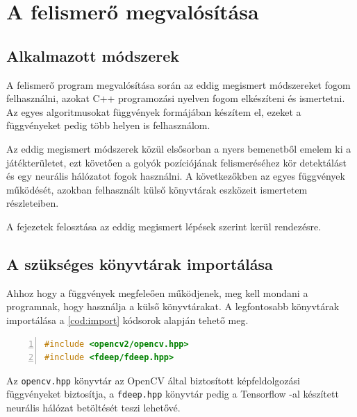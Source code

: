 \renewcommand{\lstlistingname}{kódrészlet}

\chapter{A felismerő megvalósítása}
\section{Alkalmazott módszerek}
A felismerő program megvalósítása során az eddig megismert módszereket fogom felhasználni, azokat C++ programozási nyelven fogom elkészíteni és ismertetni. Az egyes algoritmusokat függvények formájában készítem el, ezeket a függvényeket pedig több helyen is felhasználom.
\par Az eddig megismert módszerek közül elsősorban a nyers bemenetből emelem ki a játékterületet, ezt követően a golyók pozíciójának felismeréséhez kör detektálást és egy neurális hálózatot fogok használni. A következőkben az egyes függvények működését, azokban felhasznált külső könyvtárak eszközeit ismertetem részleteiben.
\par A fejezetek felosztása az eddig megismert lépések szerint kerül rendezésre.

\section{A szükséges könyvtárak importálása}
Ahhoz hogy a függvények megfeleően működjenek, meg kell mondani a programnak, hogy használja a külső könyvtárakat.
\newline A legfontosabb könyvtárak importálása a \ref{cod:import} kódsorok alapján tehető meg.

\vspace{2mm}
\hspace{-10mm}
\begin{minipage}{\linewidth}
\begin{lstlisting}[language=C++, numbers=left, caption={Könyvtárak importálása.}, label={cod:import}]
#include <opencv2/opencv.hpp>
#include <fdeep/fdeep.hpp>
\end{lstlisting}
\end{minipage}

\par Az \lstinline{opencv.hpp} könyvtár az OpenCV által biztosított képfeldolgozási függvényeket biztosítja, a \lstinline{fdeep.hpp} könyvtár pedig a Tensorflow -al készített neurális hálózat betöltését teszi lehetővé.

